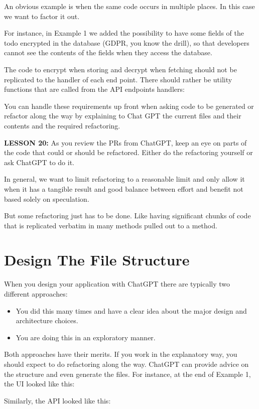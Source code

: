 \documentclass[runningheads]{llncs}
\begin{document}
An obvious example is when the same code occurs in multiple places. In this case we want to factor it out.

For instance, in Example 1 we added the possibility to have some fields of the todo encrypted in the database (GDPR, you know the drill), so that developers cannot see the contents of the fields when they access the database.

The code to encrypt when storing and decrypt when fetching should not be replicated to the handler of each end point. There should rather be utility functions that are called from the API endpoints handlers:
 
You can handle these requirements up front when asking code to be generated or refactor along the way by explaining to Chat GPT the current files and their contents and the required refactoring.

\textbf{LESSON 20:} As you review the PRs from ChatGPT, keep an eye on parts of the code that could or should be refactored. Either do the refactoring yourself or ask ChatGPT to do it.

In general, we want to limit refactoring to a reasonable limit and only allow it when it has a tangible result and good balance between effort and benefit not based solely on speculation.

But some refactoring just has to be done. Like having significant chunks of code that is replicated verbatim in many methods pulled out to a method.

\section{Design The File Structure}
When you design your application with ChatGPT there are typically two different approaches:
\begin{itemize}
    \item You did this many times and have a clear idea about the major design and architecture choices.
    \item You are doing this in an exploratory manner.
\end{itemize}

Both approaches have their merits. If you work in the explanatory way, you should expect to do refactoring along the way. ChatGPT can provide advice on the structure and even generate the files. For instance, at the end of Example 1, the UI looked like this:

Similarly, the API looked like this:
\end{document}
